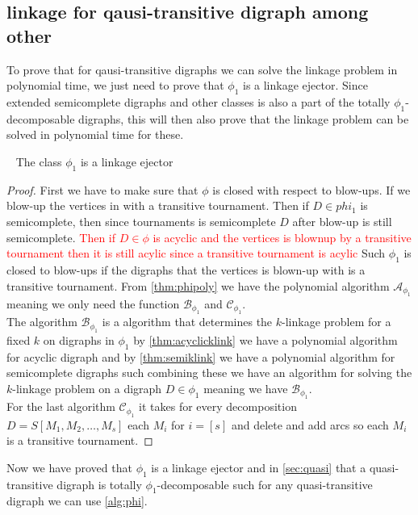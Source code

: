\subsection{linkage for qausi-transitive digraph among other}
To prove that for qausi-transitive digraphs we can solve the linkage problem in polynomial time, we just need to prove that $\phi_1$ is a linkage ejector. 
Since extended semicomplete digraphs and other classes is also a part of the totally $\phi_1$-decomposable digraphs, this will then also prove that the linkage problem can be solved in polynomial time for these.

\begin{lemma}~\cite{bangJGT85}
    The class $\phi_1$ is a linkage ejector
\end{lemma}
\begin{proof}
    First we have to make sure that $\phi$ is closed with respect to blow-ups. 
    If we blow-up the vertices in with a transitive tournament.
    Then if $D\in phi_1$ is semicomplete, then since tournaments is semicomplete $D$ after blow-up is still semicomplete.
    \textcolor{red}{Then if $D\in \phi$ is acyclic and the vertices is blownup by a transitive tournament then it is still acylic since a transitive tournament is acylic} Such $\phi_1$ is closed to blow-ups if the digraphs that the vertices is blown-up with is a transitive tournament.
    From \autoref{thm:phipoly} we have the polynomial algorithm $\mathcal{A}_{\phi_1}$ meaning we only need the function $\mathcal{B}_{\phi_1}$ and $\mathcal{C}_{\phi_1}$.\\
    The algorithm $\mathcal{B}_{\phi_1}$ is a algorithm that determines the $k$-linkage problem for a fixed $k$ on digraphs in $\phi_1$ by \autoref{thm:acyclicklink} we have a polynomial algorithm for acyclic digraph and by \autoref{thm:semiklink} we have a polynomial algorithm for semicomplete digraphs such combining these we have an algorithm for solving the $k$-linkage problem on a digraph $D\in \phi_1$ meaning we have $\mathcal{B}_{\phi_1}$. \\
    For the last algorithm $\mathcal{C}_{\phi_1}$ it takes for every decomposition $D=S[M_1,M_2,\dots , M_s]$ each $M_i$ for $i=[s]$ and delete and add arcs so each $M_i$ is a transitive tournament.
\end{proof}

Now we have proved that $\phi_1$ is a linkage ejector and in \autoref{sec:quasi} that a quasi-transitive digraph is totally $\phi_1$-decomposable such for any quasi-transitive digraph we can use \autoref{alg:phi}.  